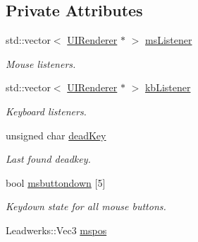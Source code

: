 \subsection*{Private Attributes}
\begin{DoxyCompactItemize}
\item 
\hypertarget{class_u_i_system_af9a599a508924e7949de438b95e2ed2f}{std\-::vector$<$ \hyperlink{class_u_i_renderer}{U\-I\-Renderer} $\ast$ $>$ \hyperlink{class_u_i_system_af9a599a508924e7949de438b95e2ed2f}{ms\-Listener}}\label{class_u_i_system_af9a599a508924e7949de438b95e2ed2f}

\begin{DoxyCompactList}\small\item\em Mouse listeners. \end{DoxyCompactList}\item 
\hypertarget{class_u_i_system_ae62a4dc19872c94de26957ccccec9112}{std\-::vector$<$ \hyperlink{class_u_i_renderer}{U\-I\-Renderer} $\ast$ $>$ \hyperlink{class_u_i_system_ae62a4dc19872c94de26957ccccec9112}{kb\-Listener}}\label{class_u_i_system_ae62a4dc19872c94de26957ccccec9112}

\begin{DoxyCompactList}\small\item\em Keyboard listeners. \end{DoxyCompactList}\item 
\hypertarget{class_u_i_system_aca722df34819c38b0a7ccc75b88eeb3f}{unsigned char \hyperlink{class_u_i_system_aca722df34819c38b0a7ccc75b88eeb3f}{dead\-Key}}\label{class_u_i_system_aca722df34819c38b0a7ccc75b88eeb3f}

\begin{DoxyCompactList}\small\item\em Last found deadkey. \end{DoxyCompactList}\item 
\hypertarget{class_u_i_system_a4b44c8ec919f89201bd36f4652f28751}{bool \hyperlink{class_u_i_system_a4b44c8ec919f89201bd36f4652f28751}{msbuttondown} \mbox{[}5\mbox{]}}\label{class_u_i_system_a4b44c8ec919f89201bd36f4652f28751}

\begin{DoxyCompactList}\small\item\em Keydown state for all mouse buttons. \end{DoxyCompactList}\item 
\hypertarget{class_u_i_system_a43e14bcc1d98c5e8651cde6e194206d7}{Leadwerks\-::\-Vec3 \hyperlink{class_u_i_system_a43e14bcc1d98c5e8651cde6e194206d7}{mspos}}\label{class_u_i_system_a43e14bcc1d98c5e8651cde6e194206d7}


\end{DoxyCompactItemize}
